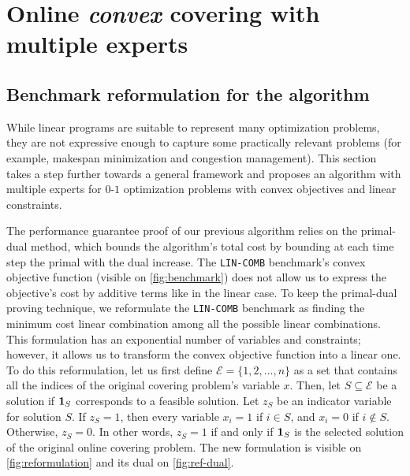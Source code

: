 
\section{Online \emph{convex} covering with multiple experts} \label{sec:convex}

\subsection{Benchmark reformulation for the algorithm}

While linear programs are suitable to represent many optimization problems, they are not expressive enough to capture some practically relevant problems (for example, makespan minimization and congestion management). This section takes a step further towards a general framework and proposes an algorithm with multiple experts for $0$-$1$ optimization problems with convex objectives and linear constraints.

The performance guarantee proof of our previous algorithm relies on the primal-dual method, which bounds the algorithm's total cost by bounding at each time step the primal with the dual increase.
The \texttt{LIN-COMB} benchmark's convex objective function (visible on \cref{fig:benchmark}) does not allow us to express the objective's cost by additive terms like in the linear case. To keep the primal-dual proving technique, we reformulate the \texttt{LIN-COMB} benchmark as finding the minimum cost linear combination among all the possible linear combinations. This formulation has an exponential number of variables and constraints; however, it allows us to transform the convex objective function into a linear one. To do this reformulation, let us first define $\mathcal{E} = \{1,2,\dots,n\}$ as a set that contains all the indices of the original covering problem's variable $x$. Then, let $S \subseteq \mathcal{E}$ be a solution if $\mathbf{1}_{S}$ corresponds to a feasible solution. Let $z_{S}$ be an indicator variable for solution $S$. If $z_{S} = 1$, then every variable $x_{i} = 1$ if $i \in S$, and $x_{i} = 0$ if $i \notin S$. Otherwise, $z_S = 0$. In other words, $z_{S} = 1$ if and only if $\mathbf{1}_{S}$ is the selected solution of the original online covering problem. The new formulation is visible on \cref{fig:reformulation} and its dual on \cref{fig:ref-dual}.

